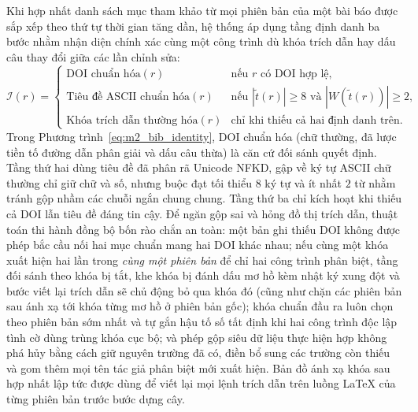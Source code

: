 Khi hợp nhất danh sách mục tham khảo từ mọi phiên bản của một bài báo được sắp xếp theo thứ tự thời gian tăng dần, hệ thống áp dụng tầng định danh ba bước nhằm nhận diện chính xác cùng một công trình dù khóa trích dẫn hay dấu câu thay đổi giữa các lần chỉnh sửa:
\begin{equation}
    \mathcal{I}(r) =
    \begin{cases}
        \text{DOI chuẩn hóa}(r) & \text{nếu } r \text{ có DOI hợp lệ}, \\
        \text{Tiêu đề ASCII chuẩn hóa}(r) & \text{nếu } |\tilde{t}(r)| \ge 8 \text{ và } |W(\tilde{t}(r))| \ge 2, \\
        \text{Khóa trích dẫn thường hóa}(r) & \text{chỉ khi thiếu cả hai định danh trên}.
    \end{cases}
    \label{eq:m2_bib_identity}
\end{equation}
Trong Phương trình~\eqref{eq:m2_bib_identity}, DOI chuẩn hóa (chữ thường, đã lược tiền tố đường dẫn phân giải và dấu câu thừa) là căn cứ đối sánh quyết định. Tầng thứ hai dùng tiêu đề đã phân rã Unicode NFKD, gập về ký tự ASCII chữ thường chỉ giữ chữ và số, nhưng buộc đạt tối thiểu $8$ ký tự và ít nhất $2$ từ nhằm tránh gộp nhầm các chuỗi ngắn chung chung. Tầng thứ ba chỉ kích hoạt khi thiếu cả DOI lẫn tiêu đề đáng tin cậy. Để ngăn gộp sai và hỏng đồ thị trích dẫn, thuật toán thi hành đồng bộ bốn rào chắn an toàn: một bản ghi thiếu DOI không được phép bắc cầu nối hai mục chuẩn mang hai DOI khác nhau; nếu cùng một khóa xuất hiện hai lần trong \emph{cùng một phiên bản} để chỉ hai công trình phân biệt, tầng đối sánh theo khóa bị tắt, khe khóa bị đánh dấu mơ hồ kèm nhật ký xung đột và bước viết lại trích dẫn sẽ chủ động bỏ qua khóa đó (cũng như chặn các phiên bản sau ánh xạ tới khóa từng mơ hồ ở phiên bản gốc); khóa chuẩn đầu ra luôn chọn theo phiên bản sớm nhất và tự gắn hậu tố số tất định khi hai công trình độc lập tình cờ dùng trùng khóa cục bộ; và phép gộp siêu dữ liệu thực hiện hợp không phá hủy bằng cách giữ nguyên trường đã có, điền bổ sung các trường còn thiếu và gom thêm mọi tên tác giả phân biệt mới xuất hiện. Bản đồ ánh xạ khóa sau hợp nhất lập tức được dùng để viết lại mọi lệnh trích dẫn trên luồng LaTeX của từng phiên bản trước bước dựng cây.

